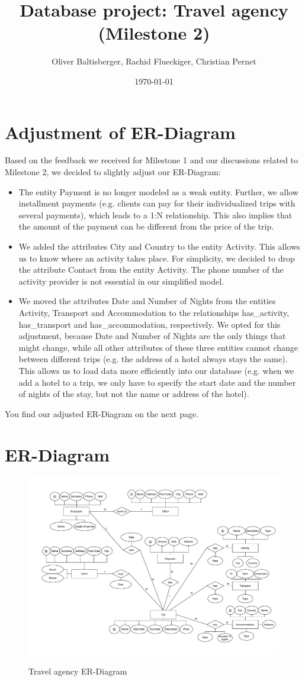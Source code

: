\documentclass{article}
\title{Database project: Travel agency \\ (Milestone 2)}
\author{Oliver Baltisberger, Rachid Flueckiger, Christian Pernet}
\date{\today}
\begin{document}
	\maketitle
	
	\section*{Adjustment of ER-Diagram}
	Based on the feedback  we received for Milestone 1 and our discussions related to Milestone 2, we decided to slightly adjust our ER-Diagram:
	\begin{itemize}
		\item The entity Payment is no longer modeled as a weak entity. Further, we allow installment payments (e.g. clients can pay for their individualized trips with several payments), which leads to a 1:N relationship.
		This also implies that the amount of the payment can be different from the price of the trip.
		\item We added the attributes City and Country to the entity Activity. This allows us to know where an activity takes place.
		For simplicity, we decided to drop the attribute Contact from the entity Activity. The phone number of the activity provider is not essential in our simplified model.
		\item We moved the attributes Date and Number of Nights from the entities Activity, Transport and Accommodation to the relationships has\_activity, has\_transport and has\_accommodation, respectively.
		We opted for this adjustment, because Date and Number of Nights are the only things that might change, while all other attributes of these three entities cannot change between different trips (e.g. the address of a hotel always stays the same).
		This allows us to load data more efficiently into our database (e.g. when we add a hotel to a trip, we only have to specify the start date and the number of nights of the stay, but not the name or address of the hotel).
	\end{itemize}
	
You find our adjusted ER-Diagram on the next page.
	\newpage
	
	\section*{ER-Diagram}
	\begin{figure}[htbp]
		\centering
			\includegraphics[width=1.15\textwidth, angle=90]{../Diagramm.pdf}
		\label{ER-Model}
		\caption{Travel agency ER-Diagram}
	\end{figure}
	
\end{document}
